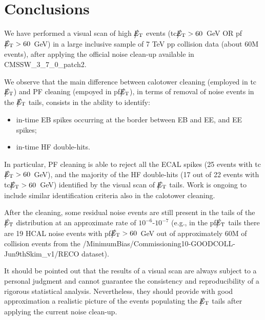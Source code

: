 \section{Conclusions}
We have performed a visual scan of high $\big\slash\hspace{-1.6ex}{E_\text{T}}$ events 
(tc$\big\slash\hspace{-1.6ex}{E_\text{T}}>60$~GeV OR pf$\big\slash\hspace{-1.6ex}{E_\text{T}}>60$~GeV)
in a large inclusive sample of 7 TeV pp collision data (about 60M events), 
after applying the official noise clean-up available in CMSSW\_3\_7\_0\_patch2.

We observe that the main difference between calotower cleaning (employed in tc$\big\slash\hspace{-1.6ex}{E_\text{T}}$) 
and PF cleaning (empoyed in pf$\big\slash\hspace{-1.6ex}{E_\text{T}}$), in 
terms of removal of noise events in the $\big\slash\hspace{-1.6ex}{E_\text{T}}$ tails, consists in the ability to identify:
\begin{itemize}
\item in-time EB spikes occurring at the border between EB and EE, and EE spikes; 
\item in-time HF double-hits.
\end{itemize}

In particular, PF cleaning is able to reject all the ECAL spikes 
(25 events with tc$\big\slash\hspace{-1.6ex}{E_\text{T}}>60$~GeV), and the majority of the HF double-hits (17 out of 22 events with 
tc$\big\slash\hspace{-1.6ex}{E_\text{T}}>60$~GeV) identified by the visual scan of $\big\slash\hspace{-1.6ex}{E_\text{T}}$ tails.
Work is ongoing to include similar identification criteria also in the calotower cleaning.

After the cleaning, some residual noise events are still present in the tails 
of the $\big\slash\hspace{-1.6ex}{E_\text{T}}$ distribution at an approximate rate of $10^{-6}$-$10^{-7}$
(e.g., in the pf$\big\slash\hspace{-1.6ex}{E_\text{T}}$ tails there are 19 HCAL noise events with pf$\big\slash\hspace{-1.6ex}{E_\text{T}}>60$~GeV 
out of approximately 60M of collision events from 
the /MinimumBias/Commissioning10-GOODCOLL-Jun9thSkim\_v1/RECO dataset).

It should be pointed out that the results of a visual scan 
are always subject to a personal judgment and cannot guarantee 
the consistency and reproducibility of a rigorous statistical analysis. 
Nevertheless, they should provide with good approximation a realistic 
picture of the events populating the $\big\slash\hspace{-1.6ex}{E_\text{T}}$ tails after applying 
the current noise clean-up.


